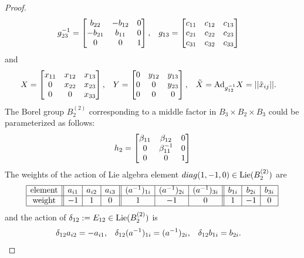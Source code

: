 \begin{proof}
\begin{align*}
g_{23}^{-1}&=  \begin{bmatrix}  b_{22}  & -b_{12} & 0 \\ -b_{21} & b_{11} & 0 \\ 0 & 0 & 1  \end{bmatrix}, &
g_{13} & = \begin{bmatrix} c_{11} & c_{12} & c_{13}\\ c_{21} & c_{22} & c_{23} \\ c_{31} & c_{32} & c_{33} \end{bmatrix}
\end{align*}
and
\begin{align*}
X &=
\begin{bmatrix}  x_{11} & x_{12} & x_{13}\\ 0 & x_{22} & x_{23} \\ 0 & 0 & x_{33} \end{bmatrix}, &
Y & = \begin{bmatrix}  0 & y_{12} & y_{13} \\ 0 & 0 & y_{23} \\ 0 & 0 & 0 \end{bmatrix}, &
\tilde{X} & = {\rm Ad}_{g^{-1}_{12}}X = ||\tilde{x}_{ij} ||.
\end{align*}
The Borel group $B_2^{(2)}$ corresponding to a middle factor in $B_3\times B_2\times B_3$ could be parameterized as follows:
\[
h_2 =
\begin{bmatrix}  \beta_{11} & \beta_{12} & 0 \\ 0 & \beta_{11}^{-1} & 0 \\ 0 & 0 & 1 \end{bmatrix}
\]
The weights of the action of  Lie algebra element  $diag(1,-1,0)\in \mathrm{Lie}(B_2^{(2)})$ are
\[
\begin{array}{|c||c|c|c||c|c|c||c|c|c|}
\hline
\text{element} &a_{i1} & a_{i2} &a_{i3} & (a^{-1})_{1i} & (a^{-1})_{2i} & (a^{-1})_{3i}
&b_{1i} & b_{2i} & b_{3i}
\\
\hline
\text{weight} & -1 & 1 & 0 & 1 &-1 & 0 & 1 & -1 & 0
\\
\hline
\end{array}
\]
and the action of $\delta_{12}:=E_{12}\in \mathrm{Lie}(B_2^{(2)})$ is
\def\ydltot{ \delta_{12}}
\def\ydltoti{ \ydltot^{-1}}
\begin{align*}
\ydltot \exav{i2}& = -\exav{i1}, &
\ydltot \aiv{1}{i} & = \aiv{2}{i}, &
\ydltot \exbv{1i} & = \exbv{2i}.
\end{align*}


\end{proof}
